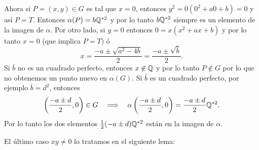 \documentclass[../../tesis_maestria]{subfiles}
\begin{document}
Ahora si $P=(x,y)\in G$ es tal que $x=0$, entonces $y^2=0(0^2+a0+b)=0$ y así $P=T$. Entonces $\alpha(P)=b\mathbb{Q}^{*2}$ y por lo tanto $b\mathbb{Q}^{*2}$ siempre es un elemento de la imagen de $\alpha$. Por otro lado, si $y=0$ entonces $0=x(x^2+ax+b)$ y por lo tanto $x=0$ (que implica $P=T$) ó
\[
	x=\frac{-a\pm\sqrt{a^2-4b}}{2}=\frac{-a\pm\sqrt{\bar{b}}}{2}.
\]
Si $\bar{b}$ no es un cuadrado perfecto, entonces $x\not\in\mathbb{Q}$ y por lo tanto $P\not\in G$ por lo que no obtenemos un punto nuevo en $\alpha(G)$. Si $\bar{b}$ es un cuadrado perfecto, por ejemplo $\bar{b}=d^2$, entonces
\[
	\left( \frac{-a\pm d}{2},0 \right)\in G\quad\Longrightarrow\quad \alpha\left( \frac{-a\pm d}{2},0 \right)=\frac{-a\pm d}{2}\mathbb{Q}^{*2}.
\]
Por lo tanto los dos elementos $\tfrac{1}{2}(-a\pm d)\mathbb{Q}^{*2}$ están en la imagen de $\alpha$.

El último caso $xy\neq0$ lo tratamos en el siguiente lema:
\end{document}
